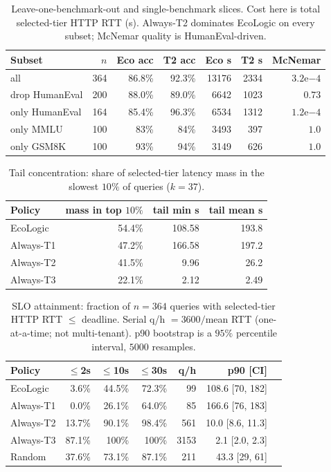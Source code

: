 \documentclass[10pt,conference]{IEEEtran}
\begin{document}
\begin{table}[t]
\centering
\caption{Leave-one-benchmark-out and single-benchmark slices. Cost here is total selected-tier HTTP RTT (s). Always-T2 dominates EcoLogic on every subset; McNemar quality is HumanEval-driven.}
\label{tab:lob}
\setlength{\tabcolsep}{2.6pt}
\begin{tabular}{@{}lrrrrrr@{}}
\toprule
Subset & $n$ & Eco acc & T2 acc & Eco s & T2 s & McNemar \\
\midrule
all & 364 & 86.8\% & 92.3\% & 13176 & 2334 & $3.2\mathrm{e}{-4}$ \\
drop HumanEval & 200 & 88.0\% & 89.0\% & 6642 & 1023 & $0.73$ \\
only HumanEval & 164 & 85.4\% & 96.3\% & 6534 & 1312 & $1.2\mathrm{e}{-4}$ \\
only MMLU & 100 & 83\% & 84\% & 3493 & 397 & $1.0$ \\
only GSM8K & 100 & 93\% & 94\% & 3149 & 626 & $1.0$ \\
\bottomrule
\end{tabular}
\end{table}

\begin{table}[t]
\centering
\caption{Tail concentration: share of selected-tier latency mass in the slowest $10\%$ of queries ($k{=}37$).}
\label{tab:tail}
\setlength{\tabcolsep}{3.2pt}
\begin{tabular}{@{}lrrr@{}}
\toprule
Policy & mass in top $10\%$ & tail min s & tail mean s \\
\midrule
EcoLogic & 54.4\% & 108.58 & 193.8 \\
Always-T1 & 47.2\% & 166.58 & 197.2 \\
Always-T2 & 41.5\% & 9.96 & 26.2 \\
Always-T3 & 22.1\% & 2.12 & 2.49 \\
\bottomrule
\end{tabular}
\end{table}

\begin{table}[t]
\centering
\caption{SLO attainment: fraction of $n{=}364$ queries with selected-tier HTTP RTT $\le$ deadline. Serial q/h $=3600/$mean RTT (one-at-a-time; not multi-tenant). p90 bootstrap is a $95\%$ percentile interval, $5000$ resamples.}
\label{tab:slo}
\setlength{\tabcolsep}{2.8pt}
\begin{tabular}{@{}lrrrrrr@{}}
\toprule
Policy & $\le$2s & $\le$10s & $\le$30s & q/h & p90 [CI] \\
\midrule
EcoLogic & 3.6\% & 44.5\% & 72.3\% & 99 & 108.6 [70, 182] \\
Always-T1 & 0.0\% & 26.1\% & 64.0\% & 85 & 166.6 [76, 183] \\
Always-T2 & 13.7\% & 90.1\% & 98.4\% & 561 & 10.0 [8.6, 11.3] \\
Always-T3 & 87.1\% & 100\% & 100\% & 3153 & 2.1 [2.0, 2.3] \\
Random & 37.6\% & 73.1\% & 87.1\% & 211 & 43.3 [29, 61] \\
\bottomrule
\end{tabular}
\end{table}
\end{document}

